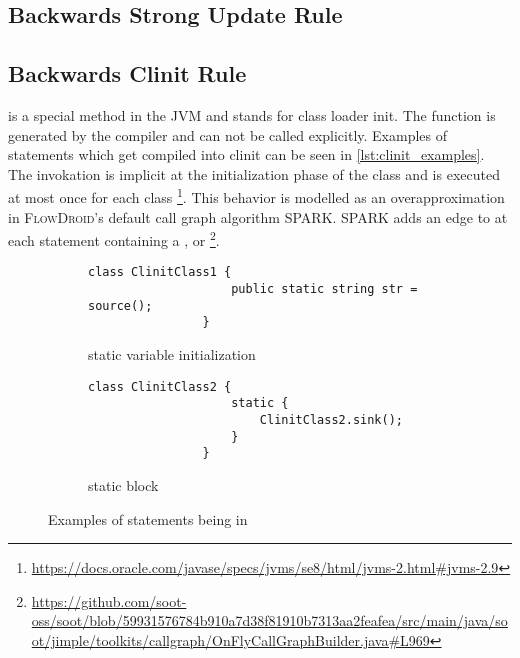 \documentclass[../draft.tex]{subfiles}
\begin{document}
    \subsection{Backwards Strong Update Rule}

    \subsection{Backwards Clinit Rule}\label{s:clinitrule}
     is a special method in the JVM and stands for class loader init. The function is generated by the compiler and can not be called explicitly. Examples of statements which get compiled into clinit can be seen in \autoref{lst:clinit_examples}. The invokation is implicit at the initialization phase of the class and is executed at most once for each class \footnote{\url{https://docs.oracle.com/javase/specs/jvms/se8/html/jvms-2.html\#jvms-2.9}}. 
    This behavior is modelled as an overapproximation in \textsc{FlowDroid}'s default call graph algorithm SPARK. SPARK adds an edge to  at each statement containing a ,  or  \footnote{\url{https://github.com/soot-oss/soot/blob/59931576784b910a7d38f81910b7313aa2feafea/src/main/java/soot/jimple/toolkits/callgraph/OnFlyCallGraphBuilder.java\#L969}}.
   
    \begin{figure}[ht]
        \centering
        \begin{subfigure}[b]{0.45\textwidth}
            \centering
            \begin{lstlisting}[gobble=16]
                class ClinitClass1 {
                    public static string str = source();
                }
            \end{lstlisting}
            \caption{static variable initialization}
            \label{lst:clinit_examples_a}
        \end{subfigure}
        \hfill
        \begin{subfigure}[b]{0.45\textwidth}
            \centering
            \begin{lstlisting}[gobble=16]
                class ClinitClass2 {
                    static {
                        ClinitClass2.sink();
                    }
                }
            \end{lstlisting}
            \caption{static block}
            \label{lst:clinit_examples_b}
        \end{subfigure}
        \caption{Examples of statements being in }
        \label{lst:clinit_examples}
    \end{figure}
\end{document}
